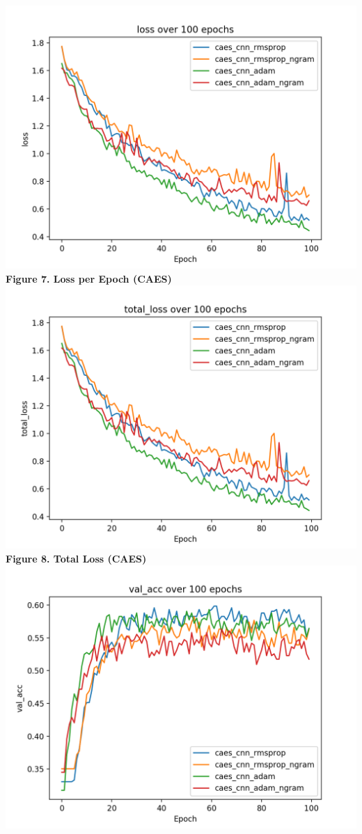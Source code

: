\documentclass[11pt,a4paper]{article}
\begin{document}
\begin{center}
	\includegraphics[scale=0.5]{lo1}\\
	\small \textbf{Figure 7. Loss per Epoch (CAES)}
	\includegraphics[scale=0.5]{tl01}\\
	\small \textbf{Figure 8. Total Loss (CAES)}
	\includegraphics[scale=0.5]{vall}\\

\end{center}
\end{document}
